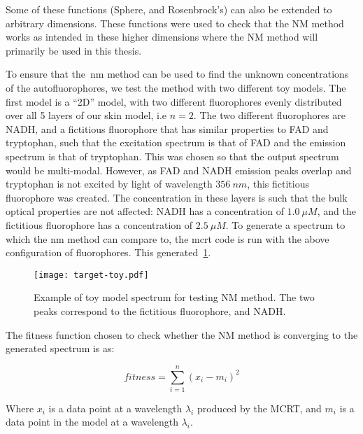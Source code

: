 Some of these functions (Sphere, and Rosenbrock's) can also be extended to arbitrary dimensions. These functions were used to check that the NM method works as intended in these higher dimensions where the NM method will primarily be used in this thesis.

To ensure that the~\gls*{nm} method can be used to find the unknown concentrations of the autofluorophores, we test the method with two different toy models.
The first model is a ``2D'' model, with two different fluorophores evenly distributed over all 5 layers of our skin model, i.e $n=2$. 
The two different fluorophores are NADH, and a fictitious fluorophore that has similar properties to FAD and tryptophan, such that the excitation spectrum is that of FAD and the emission spectrum is that of tryptophan.
This was chosen so that the output spectrum would be multi-modal.
However, as FAD and NADH emission peaks overlap and tryptophan is not excited by light of wavelength $356~nm$, this fictitious fluorophore was created.
The concentration in these layers is such that the bulk optical properties are not affected: NADH has a concentration of $1.0~\mu M$, and the fictitious fluorophore has a concentration of $2.5~\mu M$.
To generate a spectrum to which the \gls*{nm} method can compare to, the \gls*{mcrt} code is run with the above configuration of fluorophores.
This generated~\cref{fig:toymodelspectra}.


\begin{figure}[!htbp]
  \centering
  \texttt{[image: target-toy.pdf]}
  \caption{Example of toy model spectrum for testing NM method. The two peaks correspond to the fictitious fluorophore, and NADH.}
  \label{fig:toymodelspectra}
\end{figure}

The fitness function chosen to check whether the NM method is converging to the generated spectrum is as:

\begin{equation}
fitness = \sum\limits_{i=1}^{n}(x_i-m_i)^2
\end{equation}

Where $x_i$ is a data point at a wavelength $\lambda_i$ produced by the MCRT, and $m_i$ is a data point in the model at a wavelength $\lambda_i$.

